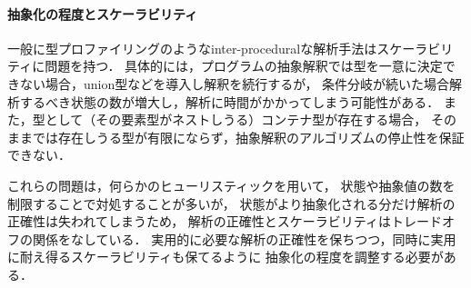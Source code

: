 \paragraph{抽象化の程度とスケーラビリティ}

一般に型プロファイリングのようなinter-proceduralな解析手法はスケーラビリティに問題を持つ．
具体的には，プログラムの抽象解釈では型を一意に決定できない場合，union型などを導入し解釈を続行するが，
条件分岐が続いた場合解析するべき状態の数が増大し，解析に時間がかかってしまう可能性がある．
また，型として（その要素型がネストしうる）コンテナ型が存在する場合，
そのままでは存在しうる型が有限にならず，抽象解釈のアルゴリズムの停止性を保証できない．

これらの問題は，何らかのヒューリスティックを用いて，
状態や抽象値の数を制限することで対処することが多いが，
状態がより抽象化される分だけ解析の正確性は失われてしまうため，
解析の正確性とスケーラビリティはトレードオフの関係をなしている．
実用的に必要な解析の正確性を保ちつつ，同時に実用に耐え得るスケーラビリティも保てるように
抽象化の程度を調整する必要がある．


